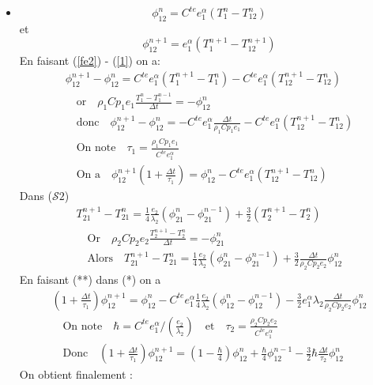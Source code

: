 \documentclass[11pt,a4paper]{scrartcl}%
\newcommand{\mtext}[1]{\quad\text{#1}\quad}%
\begin{document}
	\begin{itemize}
		\item    
		\begin{equation}\label{1}
		\phi_{12}^n = C^{te}e_1^{\alpha}(T_1^n - T_{12}^n)
		\end{equation}
		et 
		\begin{equation}\label{fe2}
		\phi_{12}^{n+1} = e_1^{\alpha}(T_1^{n+1} - T_{12}^{n+1})
		\end{equation}
		En faisant (\ref{fe2}) - (\ref{1}) on a:
		\begin{gather*}
		\phi_{12}^{n+1} - \phi_{12}^n = C^{te}e_1^{\alpha}(T_1^{n+1} - T_{1}^{n}) - C^{te}e_1^{\alpha}(T_{12}^{n+1} - T_{12}^{n})\\
		\mtext{or} \rho_1C{p_1}e_1 \frac{T_1^n - T_1^{n-1}}{\Delta t} = -\phi_{12}^n\\
		\mtext{donc}
		\phi_{12}^{n+1} - \phi_{12}^n = -C^{te}e_1^{\alpha}\frac{\Delta t}{\rho_1C{p_1}e_1} - C^{te}e_1^{\alpha}(T_{12}^{n+1} - T_{12}^{n})\\
		\mtext{On note} \tau_1 =  \frac{\rho_1C{p_1}e_1}{C^{te}e_1^{\alpha}}\\
		\mtext{On a}
		\phi_{12}^{n+1}\left(1+\frac{\Delta t}{\tau_1}\right) = \phi_{12}^{n} - C^{te}e_1^{\alpha}(T_{12}^{n+1} - T_{12}^{n})\tag{*}
		\end{gather*}
		Dans ($\mathcal{S}2$)
		\begin{gather*}
		T_{21}^{n+1}  - T_{21}^{n} =  \frac{1}{4}\frac{e_2}{\lambda_2}\left(\phi_{21}^n - \phi_{21}^{n-1} \right) + \frac{3}{2}\left(T_{2}^{n+1} - T_{2}^{n}\right)\\
		\mtext{Or} \rho_2C{p_2}e_2 \frac{T_2^{n+1} - T_2^{n}}{\Delta t} = -\phi_{21}^n\\
		\mtext{Alors}
		T_{21}^{n+1}  - T_{21}^{n} =  \frac{1}{4}\frac{e_2}{\lambda_2}\left(\phi_{21}^n - \phi_{21}^{n-1} \right) + \frac{3}{2}\frac{\Delta t}{\rho_2C{p_2}e_2}\phi_{12}^n\tag{**}
		\end{gather*}
		En faisant (**) dans (*) on a
		\begin{gather*}
		\left(1 +\frac{\Delta t}{\tau_1}\right)\phi_{12}^{n+1} = \phi_{12}^{n} - C^{te}e_1^{\alpha}\frac{ 1}{4}\frac{e_2}{\lambda_2}\left(\phi_{12}^{n}-\phi_{12}^{n-1}\right) - \frac{3}{2}e_1^{\alpha}\lambda_2\frac{\Delta t}{\rho_2C{p_2}e_2}\phi_{12}^n\\
		\mtext{On note} \hbar = C^{te}e_1^{\alpha}/\left(\frac{e_2}{\lambda_2}\right) \mtext{et} \tau_2 = \frac{\rho_2C{p_2}e_2}{C^{te}e_1^{\alpha}}\\
		\mtext{Donc} \left(1 +\frac{\Delta t}{\tau_1}\right)\phi_{12}^{n+1} = \left(1-\frac{\hbar}{4}\right)\phi_{12}^{n} + \frac{\hbar}{4}\phi_{12}^{n-1} - \frac{3}{2}\hbar\frac{\Delta t}{\tau_2}\phi_{12}^{n}
		\end{gather*}
		On obtient finalement : 
		

\end{itemize}
\end{document}
